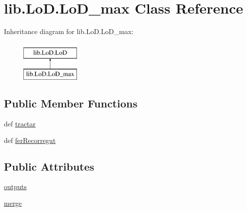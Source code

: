 \hypertarget{classlib_1_1_lo_d_1_1_lo_d__max}{\section{lib.\-Lo\-D.\-Lo\-D\-\_\-max Class Reference}
\label{classlib_1_1_lo_d_1_1_lo_d__max}
}
Inheritance diagram for lib.\-Lo\-D.\-Lo\-D\-\_\-max\-:\begin{figure}[H]
\begin{center}
\leavevmode
\includegraphics[height=2.000000cm]{classlib_1_1_lo_d_1_1_lo_d__max}
\end{center}
\end{figure}
\subsection*{Public Member Functions}
\begin{DoxyCompactItemize}
\item 
def \hyperlink{classlib_1_1_lo_d_1_1_lo_d__max_a0067719552a927ab31355f19557299ac}{tractar}
\item 
def \hyperlink{classlib_1_1_lo_d_1_1_lo_d__max_ad802986e093ee0f99372717e4868e2cc}{fer\-Recorregut}
\end{DoxyCompactItemize}
\subsection*{Public Attributes}
\begin{DoxyCompactItemize}
\item 
\hyperlink{classlib_1_1_lo_d_1_1_lo_d__max_afa61c79182ccb3f98db16449e41db00b}{outputs}
\item 
\hyperlink{classlib_1_1_lo_d_1_1_lo_d__max_a31aa5cce5529c71dd22efbe015f7e2bd}{merge}
\end{DoxyCompactItemize}


